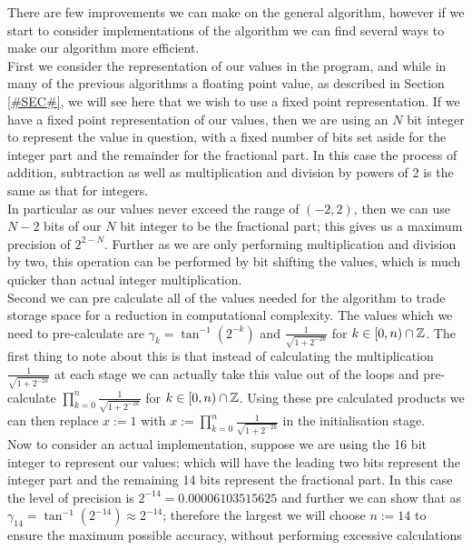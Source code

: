 {There are few improvements we can make on the general algorithm, however if we start to consider implementations of the algorithm we can find several ways to make our algorithm more efficient.\\

First we consider the representation of our values in the program, and while in many of the previous algorithms a floating point  value, as described in Section \ref{#SEC#}, we will see here that we wish to use a fixed point representation. If we have a fixed point representation of our values, then we are using an \(N\) bit integer to represent the value in question, with a fixed number of bits set aside for the integer part and the remainder for the fractional part. In this case the process of addition, subtraction as well as multiplication and division by powers of 2 is the same as that for integers.\\

In particular as our values never exceed the range of \((-2,2)\), then we can use \(N-2\) bits of our \(N\) bit integer to be the fractional part; this gives us a maximum precision of \(2^{2-N}\). Further as we are only performing multiplication and division by two, this operation can be performed by bit shifting the values, which is much quicker than actual integer multiplication.\\

Second we can pre calculate all of the values needed for the algorithm to trade storage space for a reduction in computational complexity. The values which we need to pre-calculate are \(\gamma_k = \tan^{-1}(2^{-k})\) and \(\tfrac{1}{\sqrt{1+2^{-2k}}}\) for \(k \in [0, n) \cap \mathbb{Z}\). The first thing to note about this is that instead of calculating the multiplication \(\tfrac{1}{\sqrt{1+2^{-2k}}}\) at each stage we can actually take this value out of the loops and pre-calculate \(\prod_{k=0}^n \tfrac{1}{\sqrt{1+2^{-2k}}}\) for \(k \in [0, n) \cap \mathbb{Z}\). Using these pre calculated products we can then replace \(x := 1\) with \(x := \prod_{k=0}^n \tfrac{1}{\sqrt{1+2^{-2k}}}\) in the initialisation stage.\\

Now to consider an actual implementation, suppose we are using the 16 bit integer  to represent our values; which will have the leading two bits represent the integer part and the remaining 14 bits represent the fractional part. In this case the level of precision is \(2^{-14} = 0.00006103515625\) and further we can show that as \(\gamma_{14} = \tan^{-1}(2^{-14}) \approx 2^{-14}\); therefore the largest we will choose \(n := 14\) to ensure the maximum possible accuracy, without performing excessive calculations\\

}
